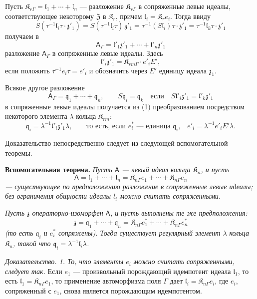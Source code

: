 \documentclass[11pt]{article}
\begin{document}
Пусть \(\mathfrak K_{r\Gamma}=\mathfrak l_1+\cdots+\mathfrak l_n\) --- разложение \(\mathfrak K_{r\Gamma}\) в сопряженные левые идеалы, соответствующее некоторому \(\mathfrak Z\) в \(\mathfrak K_r\), причем \(\mathfrak l_i=\mathfrak K_re_i\). Тогда ввиду
\[
S(\tau^{-1}\mathfrak l_i\tau\cdot\mathfrak z'_1)
=S(\tau^{-1}\mathfrak l_i\tau)\,\mathfrak z'_1
=\tau^{-1}(S\mathfrak l_i)\tau\cdot\mathfrak z'_1
=\tau^{-1}\mathfrak l_k\tau\cdot\mathfrak z'_1
\]
получаем в
\[
\tag{1}
\mathsf{A}_\Gamma=\mathfrak l'_1\mathfrak z'_1+\cdots+\mathfrak l'_n\mathfrak z'_1
\]
разложение \(\mathsf{A}_\Gamma\) в сопряженные левые идеалы. Здесь
\[
\mathfrak l'_i\mathfrak z'_1=\mathfrak K_{rm\Gamma}\cdot e'_iE',
\]
если положить \(\tau^{-1}e_i\tau=e'_i\) и обозначить через \(E'\) единицу идеала \(\mathfrak z_1\).

Всякое другое разложение
\[
\tag{2}
\mathsf{A}_\Gamma=\mathfrak q_1+\cdots+\mathfrak q_n,\qquad
S\mathfrak q_i=\mathfrak q_k\quad\text{если}\quad
S\mathfrak l'_i\mathfrak z'_1=\mathfrak l'_k\mathfrak z'_1
\]
в сопряженные левые идеалы получается из (1) преобразованием посредством некоторого элемента \(\lambda\) кольца \(\mathfrak K_{rm}\):
\[
\mathfrak q_i=\lambda^{-1}\mathfrak l'_i\mathfrak z'_1\lambda,
\qquad
\text{то есть, если \(e_i^*\) --- единица \(\mathfrak q_i\),}\quad
e'_i=\lambda^{-1}e'_iE'\lambda.
\]

Доказательство непосредственно следует из следующей вспомогательной теоремы.

\textbf{Вспомогательная теорема.} \emph{Пусть \(\mathsf{A}\) --- левый идеал кольца \(\mathfrak K_n\), и пусть}
\[
\mathsf{A}=\mathfrak l_1+\cdots+\mathfrak l_n
=\mathfrak K_{n\Gamma}e_1+\cdots+\mathfrak K_{n\Gamma}e_n
\]
\emph{--- существующее по предположению разложение в сопряженные левые идеалы; без ограничения общности идеалы \(l_i\) можно считать сопряженными.}

\emph{Пусть \(\mathfrak z\) операторно-изоморфен \(\mathsf{A}\), и пусть выполнены те же предположения:}
\[
\mathfrak z=\mathfrak q_1+\cdots+\mathfrak q_n
=\mathfrak K_{n\Gamma}e_1^*+\cdots+\mathfrak K_{n\Gamma}e_n^*
\]
\emph{(то есть \(\mathfrak q_i\) и \(e_i^*\) сопряжены). Тогда существует регулярный элемент \(\lambda\) кольца \(\mathfrak K_n\), такой что \(\mathfrak q_i=\lambda^{-1}\mathfrak l_i\lambda\).}

\emph{Доказательство. 1. То, что элементы \(e_i\) можно считать сопряженными, следует так.} Если \(e_1\) --- произвольный порождающий идемпотент идеала \(\mathfrak l_1\), то есть \(\mathfrak l_1=\mathfrak K_{n\Gamma}e_1\), то применение автоморфизма поля \(\Gamma\) дает \(\mathfrak l_i=\mathfrak K_{n\Gamma}e_i\), где \(e_i\), сопряженный с \(e_1\), снова является порождающим идемпотентом.
\end{document}
